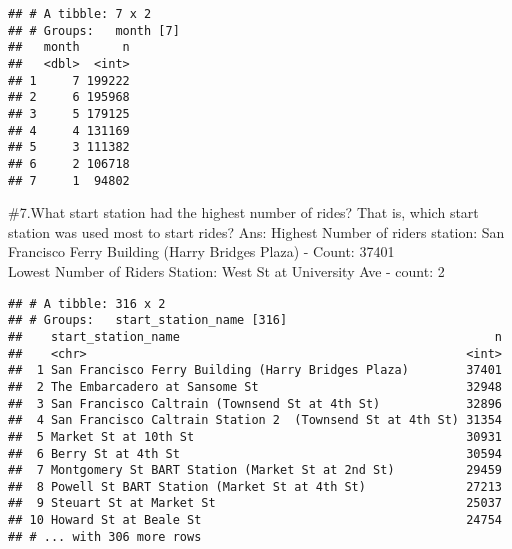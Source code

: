 \documentclass[]{article}
\newenvironment{Shaded}{\begin{snugshade}}{\end{snugshade}}
\newcommand{\KeywordTok}[1]{\textcolor[rgb]{0.13,0.29,0.53}{\textbf{#1}}}
\newcommand{\NormalTok}[1]{#1}
\newcommand{\OperatorTok}[1]{\textcolor[rgb]{0.81,0.36,0.00}{\textbf{#1}}}
\newcommand{\StringTok}[1]{\textcolor[rgb]{0.31,0.60,0.02}{#1}}
\begin{document}
\begin{verbatim}
## # A tibble: 7 x 2
## # Groups:   month [7]
##   month      n
##   <dbl>  <int>
## 1     7 199222
## 2     6 195968
## 3     5 179125
## 4     4 131169
## 5     3 111382
## 6     2 106718
## 7     1  94802
\end{verbatim}

\newpage

\#7.What start station had the highest number of rides? That is, which
start station was used most to start rides? Ans: Highest Number of
riders station: San Francisco Ferry Building (Harry Bridges Plaza) -
Count: 37401\\
Lowest Number of Riders Station: West St at University Ave - count: 2

\begin{Shaded}
\end{Shaded}

\begin{verbatim}
## # A tibble: 316 x 2
## # Groups:   start_station_name [316]
##    start_station_name                                            n
##    <chr>                                                     <int>
##  1 San Francisco Ferry Building (Harry Bridges Plaza)        37401
##  2 The Embarcadero at Sansome St                             32948
##  3 San Francisco Caltrain (Townsend St at 4th St)            32896
##  4 San Francisco Caltrain Station 2  (Townsend St at 4th St) 31354
##  5 Market St at 10th St                                      30931
##  6 Berry St at 4th St                                        30594
##  7 Montgomery St BART Station (Market St at 2nd St)          29459
##  8 Powell St BART Station (Market St at 4th St)              27213
##  9 Steuart St at Market St                                   25037
## 10 Howard St at Beale St                                     24754
## # ... with 306 more rows
\end{verbatim}

\begin{Shaded}
\end{Shaded}
\end{document}
